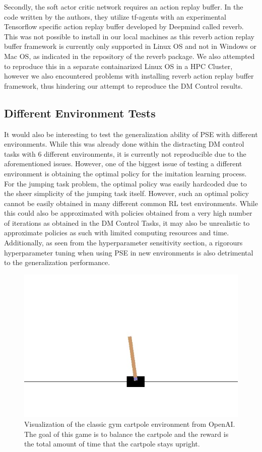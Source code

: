 \documentclass{usiinftr}
\begin{document}
Secondly, the soft actor critic network requires an action replay buffer. In the code written by the authors, they utilize tf-agents with an experimental Tensorflow specific action replay buffer developed by Deepmind called reverb. This was not possible to install in our local machines as this reverb action replay buffer framework is currently only supported in Linux OS and not in Windows or Mac OS, as indicated in the repository of the reverb package. We also attempted to reproduce this in a separate containarized Linux OS in a HPC Cluster, however we also encountered problems with installing reverb action replay buffer framework, thus hindering our attempt to reproduce the DM Control results.
\subsection{Different Environment Tests}
It would also be interesting to test the generalization ability of PSE with different environments. While this was already done within the distracting DM control tasks with 6 different environments, it is currently not reproducible due to the aforementioned issues. However, one of the biggest issue of testing a different environment is obtaining the optimal policy for the imitation learning process. For the jumping task problem, the optimal policy was easily hardcoded due to the sheer simplicity of the jumping task itself. However, such an optimal policy cannot be easily obtained in many different common RL test environments. While this could also be approximated with policies obtained from a very high number of iterations as obtained in the DM Control Tasks, it may also be unrealistic to approximate policies as such with limited computing resources and time. Additionally, as seen from the hyperparameter sensitivity section, a rigorours hyperparameter tuning when using PSE in new environments is also detrimental to the generalization performance. 

\begin{figure}[h]
    \centering
    \includegraphics[width = 0.6\linewidth]{figures/cartpole.jpg}
    \caption{Visualization of the classic gym cartpole environment from OpenAI. The goal of this game is to balance the cartpole and the reward is the total amount of time that the cartpole stays upright.\cite{openai}}
    \label{fig:Cartpole}
\end{figure}
\end{document}
